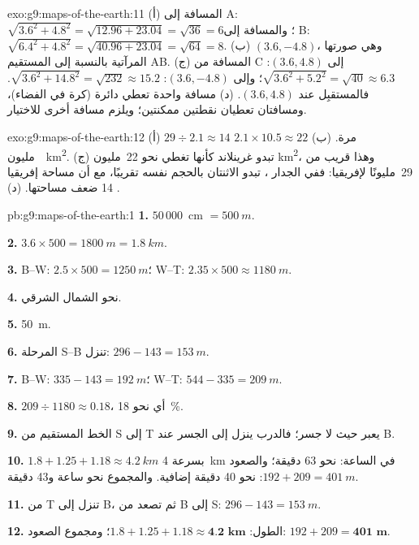 \begin{solution}{exo:g9:maps-of-the-earth:11}
(أ) المسافة إلى A: $\sqrt{3.6^2 + 4.8^2} = \sqrt{12.96 + 23.04} =
\sqrt{36} = 6$؛ والمسافة إلى B: $\sqrt{6.4^2 + 4.8^2} = \sqrt{40.96 +
23.04} = \sqrt{64} = 8$. (ب) $(3.6, -4.8)$، وهي صورتها المرآتية بالنسبة
إلى المستقيم AB. (ج) المسافة من C إلى $(3.6, 4.8)$: $\sqrt{3.6^2 + 5.2^2} =
\sqrt{40} \approx 6.3$؛ وإلى $(3.6, -4.8)$: $\sqrt{3.6^2 + 14.8^2} =
\sqrt{232} \approx 15.2$. فالمستقبِل عند $(3.6, 4.8)$. (د) مسافة واحدة
تعطي دائرة (كرة في الفضاء)، ومسافتان تعطيان نقطتين ممكنتين؛ ويلزم مسافة
أخرى للاختيار.
\end{solution}

\begin{solution}{exo:g9:maps-of-the-earth:12}
(أ) $29 \div 2.1 \approx 14$ مرة. (ب) $2.1 \times 10.5 \approx
22$~مليون~\unit{km^2}. (ج) تبدو غرينلاند كأنها تغطي نحو 22~مليون
\unit{km^2}، وهذا قريب من 29~مليونًا لإفريقيا: ففي  الجدار ، تبدو الاثنتان بالحجم نفسه تقريبًا، مع أن مساحة إفريقيا 14 ضعف
مساحتها. (د) .
\end{solution}

\begin{solution}{pb:g9:maps-of-the-earth:1}
\textbf{1.} $50\,000$~cm $= \qty{500}{m}$.

\textbf{2.} $3.6 \times 500 = \qty{1800}{m} = \qty{1.8}{km}$.

\textbf{3.} B--W: $2.5 \times 500 = \qty{1250}{m}$؛ W--T: $2.35 \times 500
\approx \qty{1180}{m}$.

\textbf{4.} نحو الشمال الشرقي.

\textbf{5.} \qty{50}{m}.

\textbf{6.} المرحلة S--B تنزل: $296 - 143 = \qty{153}{m}$.

\textbf{7.} B--W: $335 - 143 = \qty{192}{m}$؛ W--T: $544 - 335 =
\qty{209}{m}$.

\textbf{8.} $209 \div 1180 \approx 0.18$، أي نحو \qty{18}{\%}.

\textbf{9.} الخط المستقيم من S إلى T يعبر  حيث لا جسر؛ فالدرب ينزل
إلى الجسر عند B.

\textbf{10.} $1.8 + 1.25 + 1.18 \approx \qty{4.2}{km}$ بسرعة \qty{4}{km} في
الساعة: نحو 63 دقيقة؛ والصعود $192 + 209 = \qty{401}{m}$: نحو 40 دقيقة
إضافية. والمجموع نحو ساعة و43 دقيقة.

\textbf{11.} من T تنزل إلى B، ثم تصعد من B إلى S: $296 -
143 = \qty{153}{m}$.

\textbf{12.} الطول: $1.8 + 1.25 + 1.18 \approx \textbf{4.2 km}$؛ ومجموع
الصعود: $192 + 209 = \textbf{401 m}$.
\end{solution}
